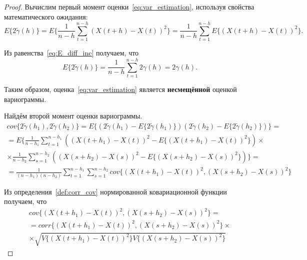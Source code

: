\begin{proof}

Вычислим первый момент оценки~\eqref{eq:var_estimation}, используя свойства математического ожидания:
\begin{equation*}
	E \{ 2 \tilde{\gamma}(h) \} = E \{ \frac{1}{n - h} \sum_{t = 1}^{n - h} {(X(t + h) - X(t))}^2 \} = \frac{1}{n - h} \sum_{t = 1}^{n - h} E \{ { (X(t + h) - X(t)) }^2 \}.
\end{equation*}

Из равенства~\eqref{eq:E_diff_inc} получаем, что
\begin{equation*}
	E \{ 2 \tilde{\gamma}(h) \} = \frac{1}{n - h} \sum_{t = 1}^{n - h} 2 \gamma(h) = 2 \gamma(h).
\end{equation*}

Таким образом, оценка~\eqref{eq:var_estimation} является \textbf{несмещённой} оценкой вариограммы.

Найдём второй момент оценки вариограммы.
\begin{equation}\begin{gathered}
\label{eq:cov_support}
	cov\{ 2 \tilde{\gamma}(h_1), 2 \tilde{\gamma}(h_2) \} = E\{ (2 \tilde{\gamma}(h_1) - E\{ 2 \tilde{\gamma}(h_1) \}) (2 \tilde{\gamma}(h_2) - E\{ 2 \tilde{\gamma}(h_2) \}) \} = \\
	= E\{ \frac{1}{n - h_1} \sum_{t = 1}^{n - h_1}({(X(t + h_1) - X(t))}^2 - E\{ {(X(t + h_1) - X(t))}^2 \}) \times \\
	\times \frac{1}{n - h_2} \sum_{s = 1}^{n - h_2}({(X(s + h_2) - X(s))}^2 - E\{ {(X(s + h_2) - X(s))}^2 \}) \} = \\
	= \frac{1}{(n - h_1)(n - h_2)} \sum_{t = 1}^{n - h_1}\sum_{s = 1}^{n - h_2} cov\{ {(X(t + h_1) - X(t))}^2, {(X(s + h_2) - X(s))}^2 \}
\end{gathered}\end{equation}

Из определения~\ref{def:corr_cov} нормированной ковариационной функции получаем, что
\begin{equation*}\begin{gathered}
	cov\{ (X(t + h_1) - X(t))^2, (X(s + h_2) - X(s))^2 \} =  \\
	= corr\{(X(t + h_1) - X(t))^2, (X(s + h_2) - X(s))^2 \} \times \\
	\times \sqrt{V\{ (X( t + h_1) - X(t))^2 \} V\{ (X(s + h_2) - X(s))^2 \}}
\end{gathered}\end{equation*}


\end{proof}
